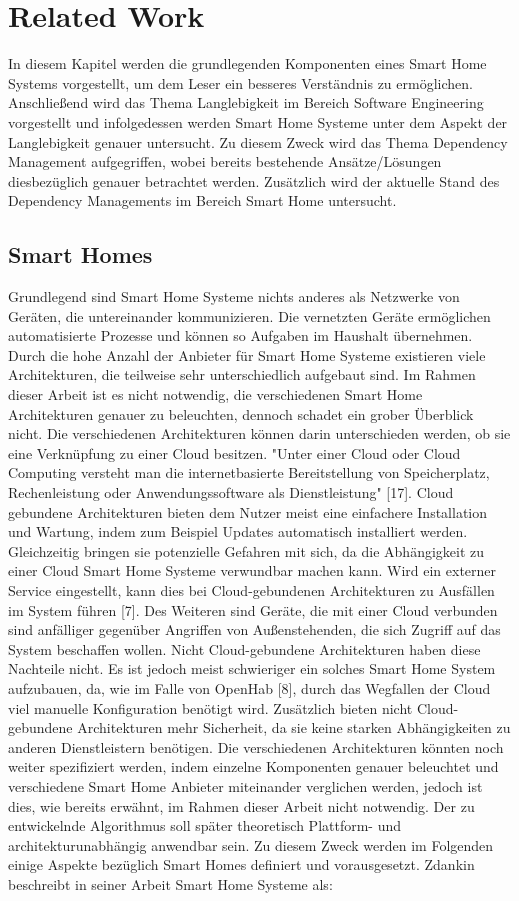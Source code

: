 \chapter{Related Work}\label{ch:related_work}
In diesem Kapitel werden die grundlegenden Komponenten eines Smart Home Systems vorgestellt, um dem
Leser ein besseres Verständnis zu ermöglichen.
Anschließend wird das Thema Langlebigkeit im Bereich Software Engineering vorgestellt und infolgedessen werden
Smart Home Systeme unter dem Aspekt der Langlebigkeit genauer untersucht. Zu diesem Zweck wird das Thema Dependency Management aufgegriffen, wobei bereits 
bestehende Ansätze/Lösungen diesbezüglich genauer betrachtet werden. Zusätzlich wird der aktuelle Stand des Dependency Managements im 
Bereich Smart Home untersucht.


\section{Smart Homes}
Grundlegend sind Smart Home Systeme nichts anderes als Netzwerke von Geräten, die untereinander kommunizieren.
Die vernetzten Geräte ermöglichen automatisierte Prozesse und können so Aufgaben im Haushalt übernehmen.
Durch die hohe Anzahl der Anbieter für Smart Home Systeme existieren viele Architekturen, die teilweise sehr unterschiedlich
aufgebaut sind. Im Rahmen dieser Arbeit ist es nicht notwendig, die verschiedenen Smart Home Architekturen genauer zu beleuchten,
dennoch schadet ein grober Überblick nicht. Die
verschiedenen Architekturen können darin unterschieden werden, ob sie eine Verknüpfung zu einer Cloud besitzen.
"Unter einer Cloud oder Cloud Computing versteht man die internetbasierte Bereitstellung von Speicherplatz, Rechenleistung oder
Anwendungssoftware als Dienstleistung" [17].
Cloud gebundene Architekturen bieten dem Nutzer meist eine einfachere Installation und Wartung, indem zum 
Beispiel Updates automatisch installiert werden. Gleichzeitig bringen sie potenzielle Gefahren mit sich, da die
Abhängigkeit zu einer Cloud Smart Home Systeme verwundbar machen kann. Wird ein externer Service eingestellt, kann dies bei
Cloud-gebundenen Architekturen zu Ausfällen im System führen [7].
Des Weiteren sind Geräte, die mit einer Cloud verbunden sind anfälliger gegenüber Angriffen von Außenstehenden, die sich 
Zugriff auf das System beschaffen wollen.
Nicht Cloud-gebundene Architekturen haben diese Nachteile nicht. Es ist jedoch meist schwieriger ein solches Smart Home System aufzubauen, 
da, wie im Falle von OpenHab [8], durch das Wegfallen der Cloud viel manuelle Konfiguration benötigt wird. Zusätzlich bieten nicht Cloud-gebundene Architekturen
mehr Sicherheit, da sie keine starken Abhängigkeiten zu anderen Dienstleistern benötigen.
Die verschiedenen Architekturen könnten noch weiter spezifiziert werden, indem einzelne Komponenten genauer beleuchtet und 
verschiedene Smart Home Anbieter miteinander verglichen werden, jedoch ist dies, wie bereits erwähnt, im Rahmen dieser 
Arbeit nicht notwendig. Der zu entwickelnde Algorithmus soll später theoretisch Plattform- und architekturunabhängig anwendbar sein.
Zu diesem Zweck werden im Folgenden einige Aspekte bezüglich Smart Homes definiert und vorausgesetzt. 
Zdankin beschreibt in seiner Arbeit Smart Home Systeme als:

